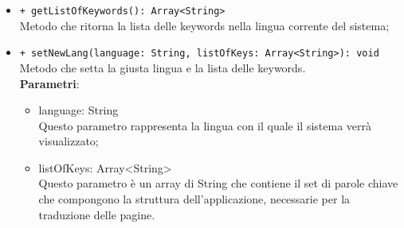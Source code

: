 \begin{itemize}
\begin{itemize}
				\item \texttt{+ getListOfKeywords(): Array<String>} \\
				Metodo che ritorna la lista delle keywords nella lingua corrente del sistema;
				
				\item \texttt{+ setNewLang(language: String, listOfKeys: Array<String>): void} \\
				Metodo che setta la giusta lingua e la lista delle keywords.\\
				\textbf{Parametri}:
				\begin{itemize}
					\item {language: String}\\
					Questo parametro rappresenta la lingua con il quale il sistema verrà visualizzato;
					\item {listOfKeys: Array<String>}\\
					Questo parametro è un array di String che contiene il set di parole chiave che compongono la struttura dell'applicazione, necessarie per la traduzione delle pagine.
				\end{itemize}
				
			\end{itemize}
		\end{itemize}
		
		